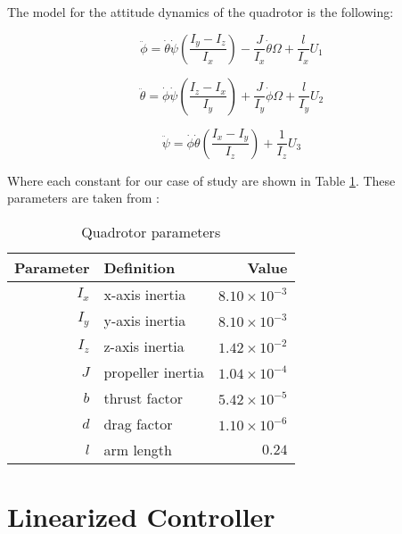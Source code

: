 \documentclass[12pt]{article}
\begin{document}
The model for the attitude dynamics of the quadrotor is the following:

\begin{equation}
\label{eq:dyn-roll}
\ddot{\phi} = \dot{\theta} \dot{\psi} \left ( \frac{I_y-I_z}{I_x} \right ) - \frac{J}{I_x} \dot{\theta} \Omega + \frac{l}{I_x} U_1
\end{equation}

\begin{equation}
\label{eq:dyn-pitch}
\ddot{\theta} = \dot{\phi} \dot{\psi} \left ( \frac{I_z-I_x}{I_y} \right ) + \frac{J}{I_y} \dot{\phi} \Omega + \frac{l}{I_y} U_2
\end{equation}

\begin{equation}
\label{eq:dyn-yaw}
\ddot{\psi} = \dot{\phi} \dot{\theta} \left ( \frac{I_x-I_y}{I_z} \right ) + \frac{1}{I_z} U_3
\end{equation}

Where each constant for our case of study are shown in Table \ref{tab:parameters}. These parameters are taken from \cite{Merh14} :

\begin{table}
  \begin{center}
    \caption{Quadrotor parameters}\label{tab:parameters}
    \begin{tabular}{rlr}
      \hline
      Parameter & Definition & Value \\
      \hline                  
      $I_x$ & x-axis inertia & $8.10 \times {10}^{-3}$\\
      $I_y$ & y-axis inertia & $8.10 \times {10}^{-3}$\\
      $I_z$ & z-axis inertia & $1.42 \times {10}^{-2}$ \\
      $J$ & propeller inertia & $1.04 \times {10}^{-4}$ \\
      $b$ & thrust factor & $ 5.42 \times {10}^{-5}$ \\
      $d$ & drag factor & $ 1.10 \times{10}^{-6}$ \\
      $l$ & arm length & $0.24$ \\
      \hline
    \end{tabular}
  \end{center}
\end{table}

\section{Linearized Controller}
\end{document}
